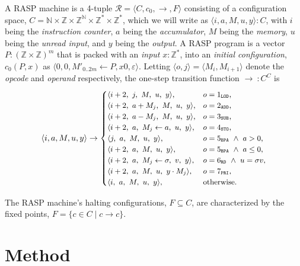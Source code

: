 \documentclass[sigplan,nonacm]{acmart}\settopmatter{printfolios=false,printccs=false,printacmref=false}
\begin{document}
A RASP machine is a 4-tuple \(\mathcal{R} = \langle C,c_0,\to,F\rangle\) consisting of a configuration space, \(C=\mathbb N\times\mathbb Z\times\mathbb Z^{\mathbb N}\times\mathbb Z^*\times\mathbb Z^*\), which we will write as $\langle i,a,M,u,y\rangle: C$, with \(i\) being the \textit{instruction counter}, \(a\) being the \textit{accumulator}, \(M\) being the \textit{memory}, \(u\) being the \textit{unread input}, and \(y\) being the \textit{output}. A RASP program is a vector $P: (\mathbb Z\times\mathbb Z)^m$ that is packed with an \textit{input} $x: \mathbb{Z}^*$, into an \textit{initial configuration}, \(c_0(P, x)\) as \(\langle 0,0,M'_{0..2m} \gets P,x0,\varepsilon \rangle\). Letting \(\langle o,j\rangle=\langle M_i,M_{i+1}\rangle\) denote the \textit{opcode} and \textit{operand} respectively, the one-step transition function $\rightarrow\::C^C$ is
\[\small
  \langle i,a,M,u,y\rangle \rightarrow
  \begin{cases}
    \langle i+2,\ j    ,\ M               ,\ u,\ y          \rangle, & o=1_\texttt{LOD},\\
    \langle i+2,\ a+M_j,\ M               ,\ u,\ y          \rangle, & o=2_\texttt{ADD},\\
    \langle i+2,\ a-M_j,\ M               ,\ u,\ y          \rangle, & o=3_\texttt{SUB},\\
    \langle i+2,\ a    ,\ M_j\gets a      ,\ u,\ y          \rangle, & o=4_\texttt{STO},\\
    \langle j  ,\ a    ,\ M               ,\ u,\ y          \rangle, & o=5_\texttt{BPA}\ \wedge\ a>0,\\
    \langle i+2,\ a    ,\ M               ,\ u,\ y          \rangle, & o=5_\texttt{BPA}\ \wedge\ a\le 0,\\
    \langle i+2,\ a    ,\ M_j\gets \sigma ,\ v,\ y          \rangle, & o=6_\texttt{RD}\ \wedge\ u=\sigma v,\\
    \langle i+2,\ a    ,\ M               ,\ u,\ y\cdot M_j \rangle, & o=7_\texttt{PRI},\\
    \langle i  ,\ a    ,\ M               ,\ u,\ y          \rangle, & \text{otherwise.}
  \end{cases}
\]

\noindent The RASP machine's halting configurations, $F \subseteq C$, are characterized by the fixed points, $F= \{c \in C \mid c \rightarrow c\}$.
\pagebreak

\section{Method}
\end{document}
